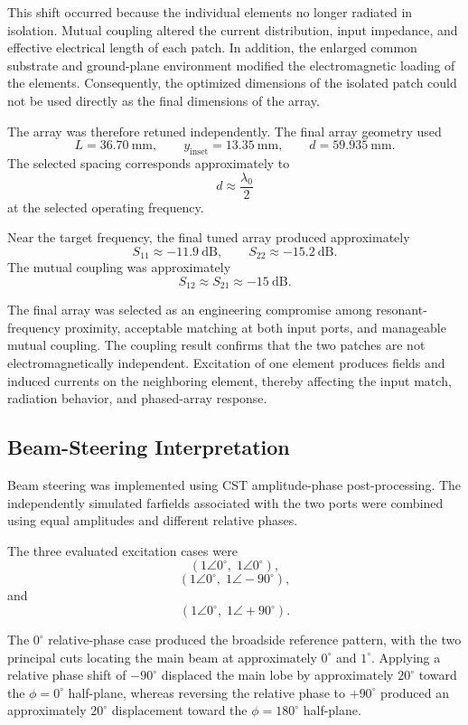 This shift occurred because the individual elements no longer radiated in isolation. Mutual coupling
altered the current distribution, input impedance, and effective electrical length of each patch.
In addition, the enlarged common substrate and ground-plane environment modified the electromagnetic
loading of the elements. Consequently, the optimized dimensions of the isolated patch could not be
used directly as the final dimensions of the array.

The array was therefore retuned independently. The final array geometry used
\[
L=36.70~\mathrm{mm},
\qquad
y_{\mathrm{inset}}=13.35~\mathrm{mm},
\qquad
d=59.935~\mathrm{mm}.
\]
The selected spacing corresponds approximately to
\[
d\approx\frac{\lambda_0}{2}
\]
at the selected operating frequency.

Near the target frequency, the final tuned array produced approximately
\[
S_{11}\approx -11.9~\mathrm{dB},
\qquad
S_{22}\approx -15.2~\mathrm{dB}.
\]
The mutual coupling was approximately
\[
S_{12}\approx S_{21}\approx -15~\mathrm{dB}.
\]

The final array was selected as an engineering compromise among resonant-frequency proximity,
acceptable matching at both input ports, and manageable mutual coupling. The coupling result confirms
that the two patches are not electromagnetically independent. Excitation of one element produces
fields and induced currents on the neighboring element, thereby affecting the input match, radiation
behavior, and phased-array response.

\subsection{Beam-Steering Interpretation}

Beam steering was implemented using CST amplitude-phase post-processing. The independently simulated
farfields associated with the two ports were combined using equal amplitudes and different relative
phases.

The three evaluated excitation cases were
\[
\left(1\angle0^\circ,\;1\angle0^\circ\right),
\]
\[
\left(1\angle0^\circ,\;1\angle-90^\circ\right),
\]
and
\[
\left(1\angle0^\circ,\;1\angle+90^\circ\right).
\]

The \(0^\circ\) relative-phase case produced the broadside reference pattern, with the two principal
cuts locating the main beam at approximately \(0^\circ\) and \(1^\circ\). Applying a relative phase
shift of \(-90^\circ\) displaced the main lobe by approximately \(20^\circ\) toward the
\(\phi=0^\circ\) half-plane, whereas reversing the relative phase to \(+90^\circ\) produced an
approximately \(20^\circ\) displacement toward the \(\phi=180^\circ\) half-plane.

